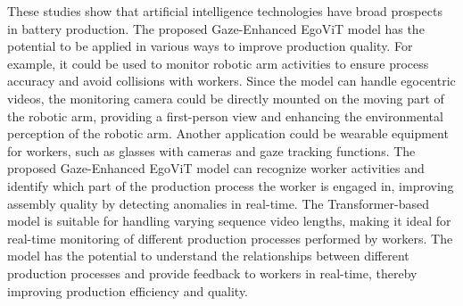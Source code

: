 These studies show that artificial intelligence technologies have broad prospects in battery production. The proposed Gaze-Enhanced EgoViT model has the potential to be applied in various ways to improve production quality. For example, it could be used to monitor robotic arm activities to ensure process accuracy and avoid collisions with workers. Since the model can handle egocentric videos, the monitoring camera could be directly mounted on the moving part of the robotic arm, providing a first-person view and enhancing the environmental perception of the robotic arm. Another application could be wearable equipment for workers, such as glasses with cameras and gaze tracking functions. The proposed Gaze-Enhanced EgoViT model can recognize worker activities and identify which part of the production process the worker is engaged in, improving assembly quality by detecting anomalies in real-time. The Transformer-based model is suitable for handling varying sequence video lengths, making it ideal for real-time monitoring of different production processes performed by workers. The model has the potential to understand the relationships between different production processes and provide feedback to workers in real-time, thereby improving production efficiency and quality.